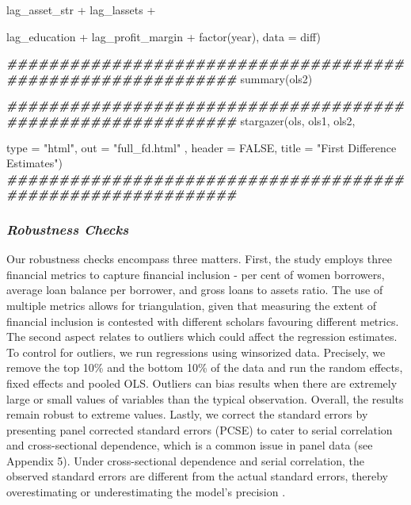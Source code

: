 \documentclass[a4paper,nobind]{templates/ociamthesis}
\newenvironment{Shaded}{\begin{snugshade}}{\end{snugshade}}
\newcommand{\AttributeTok}[1]{\textcolor[rgb]{0.77,0.63,0.00}{#1}}
\newcommand{\ConstantTok}[1]{\textcolor[rgb]{0.00,0.00,0.00}{#1}}
\newcommand{\DocumentationTok}[1]{\textcolor[rgb]{0.56,0.35,0.01}{\textbf{\textit{#1}}}}
\newcommand{\FunctionTok}[1]{\textcolor[rgb]{0.00,0.00,0.00}{#1}}
\newcommand{\NormalTok}[1]{#1}
\newcommand{\SpecialCharTok}[1]{\textcolor[rgb]{0.00,0.00,0.00}{#1}}
\newcommand{\StringTok}[1]{\textcolor[rgb]{0.31,0.60,0.02}{#1}}
\renewenvironment{Shaded}
{
  \vspace{10pt}%
  \begin{snugshade}%
}{%
  \end{snugshade}%
  \vspace{8pt}%
}
\begin{document}
\begin{Shaded}
\begin{Highlighting}[]
\NormalTok{            lag\_asset\_str }\SpecialCharTok{+}\NormalTok{ lag\_lassets }\SpecialCharTok{+} 
            
\NormalTok{            lag\_education }\SpecialCharTok{+}\NormalTok{ lag\_profit\_margin }\SpecialCharTok{+} \FunctionTok{factor}\NormalTok{(year), }\AttributeTok{data =}\NormalTok{ diff)}

\DocumentationTok{\#\#\#\#\#\#\#\#\#\#\#\#\#\#\#\#\#\#\#\#\#\#\#\#\#\#\#\#\#\#\#\#\#\#\#\#\#\#\#\#\#\#\#\#\#\#\#\#\#\#\#\#\#\#\#\#\#\#\#\#}
\FunctionTok{summary}\NormalTok{(ols2)}

\DocumentationTok{\#\#\#\#\#\#\#\#\#\#\#\#\#\#\#\#\#\#\#\#\#\#\#\#\#\#\#\#\#\#\#\#\#\#\#\#\#\#\#\#\#\#\#\#\#\#\#\#\#\#\#\#\#\#\#\#\#\#\#\#}
\FunctionTok{stargazer}\NormalTok{(ols, ols1, ols2, }
          
          \AttributeTok{type =} \StringTok{"html"}\NormalTok{, }\AttributeTok{out =} \StringTok{"full\_fd.html"}\NormalTok{ , }\AttributeTok{header =} \ConstantTok{FALSE}\NormalTok{, }\AttributeTok{title =} \StringTok{"First Difference }
\StringTok{          }
\StringTok{          Estimates"}\NormalTok{)}
\DocumentationTok{\#\#\#\#\#\#\#\#\#\#\#\#\#\#\#\#\#\#\#\#\#\#\#\#\#\#\#\#\#\#\#\#\#\#\#\#\#\#\#\#\#\#\#\#\#\#\#\#\#\#\#\#\#\#\#\#\#\#\#\#}
\end{Highlighting}
\end{Shaded}

\hypertarget{robustness-checks}{%
\subsubsection{\texorpdfstring{\textbf{\emph{Robustness Checks}}}{Robustness Checks}}\label{robustness-checks}}

Our robustness checks encompass three matters. First, the study employs three financial metrics to capture financial inclusion - per cent of women borrowers, average loan balance per borrower, and gross loans to assets ratio. The use of multiple metrics allows for triangulation, given that measuring the extent of financial inclusion is contested with different scholars favouring different metrics. The second aspect relates to outliers which could affect the regression estimates. To control for outliers, we run regressions using winsorized data. Precisely, we remove the top 10\% and the bottom 10\% of the data and run the random effects, fixed effects and pooled OLS. Outliers can bias results when there are extremely large or small values of variables than the typical observation. Overall, the results remain robust to extreme values. Lastly, we correct the standard errors by presenting panel corrected standard errors (PCSE) to cater to serial correlation and cross-sectional dependence, which is a common issue in panel data (see Appendix 5). Under cross-sectional dependence and serial correlation, the observed standard errors are different from the actual standard errors, thereby overestimating or underestimating the model's precision \autocite{pesaran2021general}.
\end{document}
